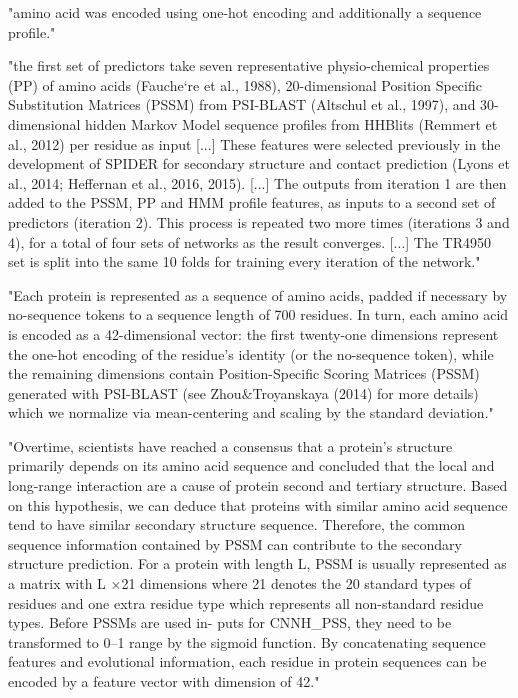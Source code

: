  "amino acid was encoded using one-hot encoding and additionally a sequence profile." \cite{Jurtz2017}

 "the first set of predictors take seven representative physio-chemical properties (PP) of amino acids (Fauche`re et al., 1988), 20-dimensional Position Specific Substitution Matrices (PSSM) from PSI-BLAST (Altschul et al., 1997), and 30-dimensional hidden Markov Model sequence profiles from HHBlits (Remmert et al., 2012) per residue as input [...] These features were selected previously in the development of SPIDER for secondary structure and contact prediction (Lyons et al., 2014; Heffernan et al., 2016, 2015). [...] The outputs from iteration 1 are then added to the PSSM, PP and HMM profile features, as inputs to a second set of predictors (iteration 2). This process is repeated two more times (iterations 3 and 4), for a total of four sets of networks as the result converges. [...] The TR4950 set is split into the same 10 folds for training every iteration of the network." \cite{Heffernan2017}

 "Each protein is represented as a sequence of amino acids, padded if necessary by no-sequence tokens to a sequence length of 700 residues. In turn, each amino acid is encoded as a 42-dimensional vector: the first twenty-one dimensions represent the one-hot encoding of the residue’s identity (or the no-sequence token), while the remaining dimensions contain Position-Specific Scoring Matrices (PSSM) generated with PSI-BLAST (see Zhou\&Troyanskaya (2014) for more details) which we normalize via mean-centering and scaling by the standard deviation." \cite{Busia2017}

 "Overtime, scientists have reached a consensus that a protein’s structure primarily depends on its amino acid sequence and concluded that the local and long-range interaction are a cause of protein second and tertiary structure. Based on this hypothesis, we can deduce that proteins with similar amino acid sequence tend to have similar secondary structure sequence. Therefore, the common sequence information contained by PSSM can contribute to the secondary structure prediction. For a protein with length L, PSSM is usually represented as a matrix with L ×21 dimensions where 21 denotes the 20 standard types of residues and one extra residue type which represents all non-standard residue types. Before PSSMs are used in- puts for CNNH\_PSS, they need to be transformed to 0–1 range by the sigmoid function. By concatenating sequence features and evolutional information, each residue in protein sequences can be encoded by a feature vector with dimension of 42." \cite{Zhou2018}
